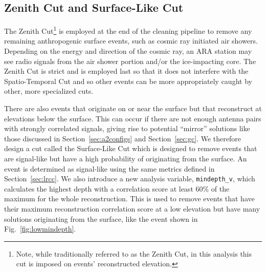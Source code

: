   \subsection{Zenith Cut and Surface-Like Cut \label{sec:zc_slc}}

    The Zenith Cut\footnote{
      Note, while traditionally referred to as the Zenith Cut, in this analysis this cut is imposed on events' reconstructed elevation.
    } is employed at the end of the cleaning pipeline to remove any remaining anthropogenic surface events, such as cosmic ray initiated air showers. 
    Depending on the energy and direction of the cosmic ray, an ARA station may see radio signals from the air shower portion and/or the ice-impacting core. 
    The Zenith Cut is strict and is employed last so that it does not interfere with the Spatio-Temporal Cut and so other events can be more appropriately caught by other, more specialized cuts.

    There are also events that originate on or near the surface but that reconstruct at elevations below the surface. 
    This can occur if there are not enough antenna pairs with strongly correlated signals, giving rise to potential ``mirror'' solutions like those discussed in Section~\ref{sec:a2configs} and Section~\ref{sec:gc}.
    We therefore design a cut called the Surface-Like Cut which is designed to remove events that are signal-like but have a high probability of originating from the surface. 
    An event is determined as signal-like using the same metrics defined in Section~\ref{sec:lrcc}.
    We also introduce a new analysis variable, \texttt{mindepth\_v}, which calculates the highest depth with a correlation score at least 60\% of the maximum for the whole reconstruction. 
    This is used to remove events that have their maximum reconstruction correlation score at a low elevation but have many solutions originating from the surface, like the event shown in Fig.~\ref{fig:lowmindepth}.

